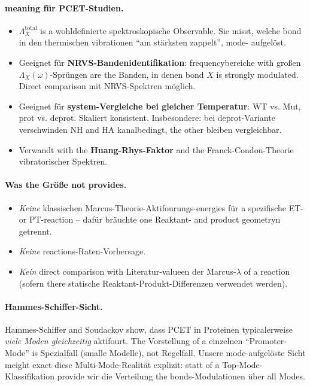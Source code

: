 \documentclass[11pt,a4paper,twoside]{article}
\theoremstyle{remark}
\begin{document}
\paragraph{meaning f\"ur PCET-Studien.}
\begin{itemize}\setlength{\itemsep}{0pt}
  \item $\Lambda_X^\text{total}$ is a wohldefinierte
        spektroskopische Observable. Sie misst, welche bond in den
        thermischen vibrationen "`am st\"arksten zappelt"', mode-
        aufgel\"ost.
  \item Geeignet f\"ur \textbf{NRVS-Bandenidentifikation}:
        frequencybereiche with gro{\ss}en
        $\Lambda_X(\omega)$-Spr\"ungen are the Banden, in denen
        bond $X$ is strongly modulated. Direct comparison mit
        NRVS-Spektren m\"oglich.
  \item Geeignet f\"ur \textbf{system-Vergleiche bei gleicher
        Temperatur}: WT vs. Mut, prot vs. deprot. Skaliert konsistent.
        Insbesondere: bei deprot-Variante verschwinden NH and HA
        kanalbedingt, the other bleiben vergleichbar.
  \item Verwandt with the \textbf{Huang-Rhys-Faktor}
        \cite{HuangRhys1950} and the Franck-Condon-Theorie
        vibratorischer Spektren.
\end{itemize}

\paragraph{Was the Gr\"o{\ss}e not provides.}
\begin{itemize}\setlength{\itemsep}{0pt}
  \item \emph{Keine} klassischen Marcus-Theorie-Aktifourungs-energies
        f\"ur a spezifische ET- or PT-reaction -- daf\"ur br\"auchte
        one Reaktant- and product geometryn getrennt.
  \item \emph{Keine} reactions-Raten-Vorhersage.
  \item \emph{Kein} direct comparison with Literatur-valueen der
        Marcus-$\lambda$ of a reaction (sofern there statische
        Reaktant-Produkt-Differenzen verwendet werden).
\end{itemize}

\paragraph{Hammes-Schiffer-Sicht.}
Hammes-Schiffer and Soudackov \cite{HammesSchifferSoudackov2008}
show, dass PCET in Proteinen typicalerweise \emph{viele Moden
gleichzeitig} aktifourt. The Vorstellung of a einzelnen
"`Promoter-Mode"' is Spezialfall (smalle Modelle), not Regelfall.
Unsere mode-aufgel\"oste Sicht meight exact diese Multi-Mode-Realit\"at
explizit: statt of a Top-Mode-Klassifikation provide wir die
Verteilung the bonds-Modulationen \"uber all Modes.
\end{document}
